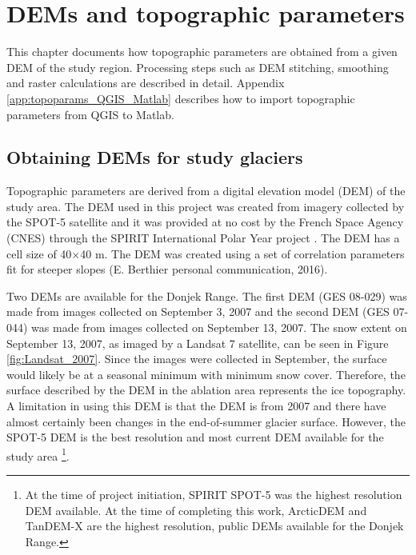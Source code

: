\documentclass{sfuthesis}
\begin{document}
\chapter{DEMs and topographic parameters}

This chapter documents how topographic parameters are obtained from a given DEM of the study region. Processing steps such as DEM stitching, smoothing and raster calculations are described in detail.  Appendix \ref{app:topoparams_QGIS_Matlab} describes how to import topographic parameters from QGIS to Matlab. 

\section{Obtaining DEMs for study glaciers}

Topographic parameters are derived from a digital elevation model (DEM) of the study area. The DEM used in this project was created from imagery collected by the SPOT-5 satellite and it was provided at no cost by the French Space Agency (CNES) through the SPIRIT International Polar Year project \citep{Korona2009}. The DEM has a cell size of 40$\times$40 m. The DEM was created using a set of correlation parameters fit for steeper slopes (E. Berthier personal communication, 2016). 

Two DEMs are available for the Donjek Range. The first DEM (GES 08-029) was made from images collected on September 3, 2007 and the second DEM (GES 07-044) was made from images collected on September 13, 2007. The snow extent on September 13, 2007, as imaged by a Landsat 7 satellite, can be seen in Figure \ref{fig:Landsat_2007}. Since the images were collected in September, the surface would likely be at a seasonal minimum with minimum snow cover. Therefore, the surface described by the DEM in the ablation area represents the ice topography. A limitation in using this DEM is that the DEM is from 2007 and there have almost certainly been changes in the end-of-summer glacier surface. However, the SPOT-5 DEM is the best resolution and most current DEM available for the study area \footnote{At the time of project initiation, SPIRIT SPOT-5 was the highest resolution DEM available. At the time of completing this work, ArcticDEM and TanDEM-X are the highest resolution, public DEMs available for the Donjek Range.}. 
\end{document}
